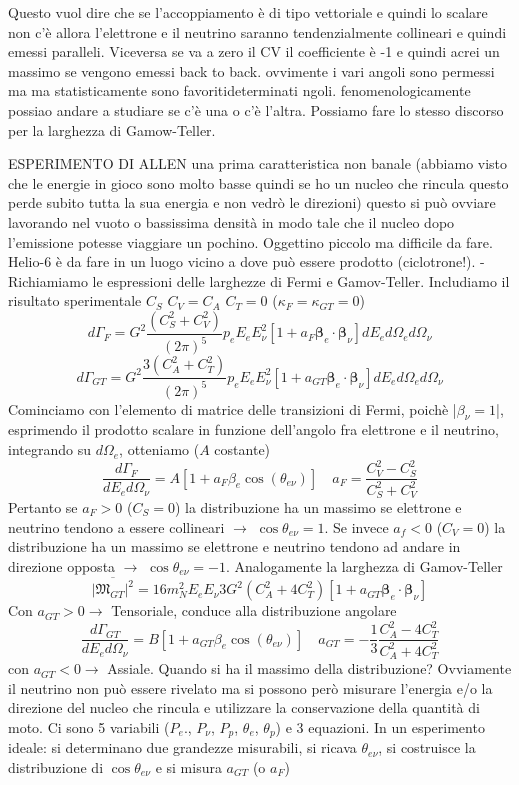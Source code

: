 Questo vuol dire che se l'accoppiamento è di tipo vettoriale e quindi lo scalare non c'è allora l'elettrone e il neutrino saranno tendenzialmente collineari e quindi emessi paralleli. Viceversa se va a zero il CV il coefficiente è -1 e quindi acrei un massimo se vengono emessi back to back. ovvimente i vari angoli sono permessi ma ma statisticamente sono favoritideterminati ngoli. fenomenologicamente possiao andare a studiare se c'è una o c'è l'altra. Possiamo fare lo stesso discorso per la larghezza di Gamow-Teller.

ESPERIMENTO DI ALLEN
una prima caratteristica non banale (abbiamo visto che le energie in gioco sono molto basse quindi se ho un nucleo che rincula questo perde subito tutta la sua energia e non vedrò le direzioni) questo si può ovviare lavorando nel vuoto o bassissima densità in modo tale che il nucleo dopo l'emissione potesse viaggiare un pochino. Oggettino piccolo ma difficile da fare. Helio-6 è da fare in un luogo vicino a dove può essere prodotto (ciclotrone!).
-
Richiamiamo le espressioni delle larghezze di Fermi e Gamov-Teller. Includiamo il risultato sperimentale $C_S$ $C_V=C_A$ $C_T=0$ ($\kappa_F=\kappa_{GT}=0$)
$$
d\Gamma_F = G^2 \frac{(C_S^2 + C_V^2)}{(2\pi)^5} p_e E_e E_\nu^2 [1 + a_F \boldsymbol{\beta}_e \cdot \boldsymbol{\beta}_\nu ] dE_e d\Omega_e d\Omega_\nu
$$
$$
d\Gamma_{GT} = G^2 \frac{3(C_A^2 + C_T^2)}{(2\pi)^5} p_e E_e E_\nu^2 [1 + a_{GT} \boldsymbol{\beta}_e \cdot \boldsymbol{\beta}_\nu ] dE_e d\Omega_e d\Omega_\nu
$$
Cominciamo con l'elemento di matrice delle transizioni di Fermi, poichè |$\beta_\nu=1$|, esprimendo il prodotto scalare in funzione dell'angolo fra elettrone e il neutrino, integrando su $d\Omega_e$, otteniamo ($A$ costante)
$$
\frac{d\Gamma_F}{dE_e d\Omega_\nu} = A [1 + a_F \beta_e \cos(\theta_{e\nu})] \quad a_F = \frac{C_V^2 - C_S^2}{C_S^2 + C_V^2}
$$
Pertanto se $a_F>0$ ($C_S=0$) la distribuzione ha un massimo se elettrone e neutrino tendono a essere collineari $\to$ $\cos{\theta_{e\nu}}=1$. Se invece $a_f<0$ ($C_V=0$) la distribuzione ha un massimo se elettrone e neutrino tendono ad andare in direzione opposta $\to$ $\cos{\theta_{e\nu}}=-1$. Analogamente la larghezza di Gamov-Teller
$$
\overline{|\mathfrak{M}_{GT}|^2} = 16m_N^2 E_e E_\nu 3 G^2 (C_A^2 + 4C_T^2) [1 + a_{GT} \boldsymbol{\beta}_e \cdot \boldsymbol{\beta}_\nu]
$$
Con $a_{GT}>0\to$ Tensoriale, conduce alla distribuzione angolare
$$
\frac{d\Gamma_{GT}}{dE_e d\Omega_\nu} = B [1 + a_{GT} \beta_e \cos(\theta_{e\nu})] \quad a_{GT} = -\frac{1}{3} \frac{C_A^2 - 4C_T^2}{C_A^2 + 4C_T^2}
$$
con $a_{GT}<0\to$ Assiale. Quando si ha il massimo della distribuzione? Ovviamente il neutrino non può essere rivelato ma si possono però misurare l'energia e/o la direzione del nucleo che rincula e utilizzare la conservazione della quantità di moto. Ci sono 5 variabili ($P_e$., $P_\nu$, $P_p$, $\theta_e$, $\theta_p$) e 3 equazioni. In un esperimento ideale: si determinano due grandezze misurabili, si ricava $\theta_{e\nu}$, si costruisce la distribuzione di $\cos{\theta_{e\nu}}$ e si misura $a_{GT}$ (o $a_F$)
